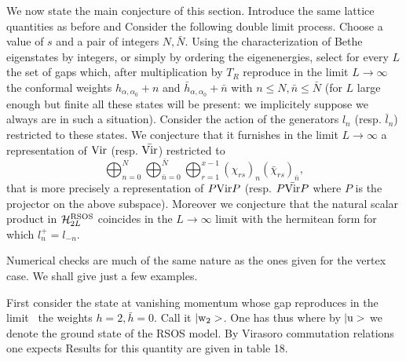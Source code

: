 We now state the main conjecture of this section. Introduce the same
 lattice quantities as before
%
\eqn{}
%
and
%
\eqn{}
%
Consider the following double limit process. Choose a value of $s$
 and a pair of
integers $N,\bar{N}$.
Using the characterization of Bethe eigenstates by integers, or
simply by ordering the
eigenenergies, select for every $L$ the set of
gaps which, after multiplication by $T_R$
reproduce in the limit $L\rightarrow\infty$ the conformal weights
 $h_{\alpha,\alpha_0}+n$
and $\bar{h}_{\alpha,\alpha_0}+\bar{n}$ with $n\leq N,\bar{n}\leq\bar{N}$
 (for $L$ large enough
but finite all these states will be present: we implicitely suppose we
 always are in such
 a situation). Consider the action of the generators $l_n$ (resp.
$\bar{l}_n$) restricted to these
states. We conjecture that it furnishes in the limit $L\rightarrow\infty$ a
representation
 of $\hbox{Vir}$
 (resp. $\bar{\hbox{Vir}}$) restricted to
$$
\bigoplus_{n=0}^N\bigoplus_{\bar{n}=0}^{\bar{N}}\bigoplus_{r=1}^{x-1}
\left(\chi_{rs}\right)_n\left(\bar{\chi}_{rs}\right)_{\bar{n}},
$$
that is  more precisely a representation of $P\hbox{Vir}P$ (resp.
$P\bar{\hbox{Vir}}P$ where $P$ is the projector on the
above subspace).  Moreover we conjecture that the  natural scalar product in
${\cal H}_{2L}^{\rm RSOS}$
coincides in
the $L\rightarrow\infty$ limit
with the hermitean form for which $l_n^{+}=l_{-n}$.


Numerical checks are much of the same nature as the ones given for the
vertex case. We shall give just a few examples.

First consider the state at vanishing momentum whose gap reproduces in the
limit \limitfour\ the weights $h=2,\bar{h}=0$. Call it $|\hbox{w}_2>$. One has
thus
%
\eqn{}
%
where by $|\hbox{u}>$ we denote the ground state of the RSOS model. By
Virasoro commutation relations one expects
%
\eqn{}
%
Results for this quantity are given in table 18.




